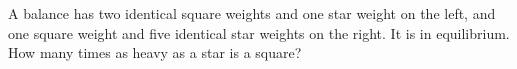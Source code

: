 A balance has two identical square weights and one star weight on the left, and one square weight and five identical star weights on the right. It is in equilibrium. How many times as heavy as a star is a square?
